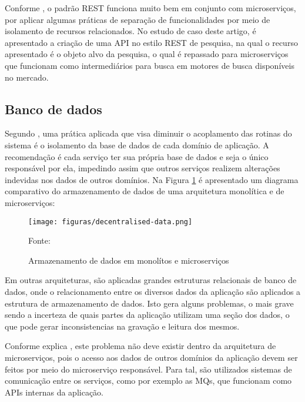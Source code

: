 Conforme , o padrão \ac{REST} funciona muito bem
em conjunto com microserviços, por aplicar algumas práticas de separação
de funcionalidades por meio de isolamento de recursos relacionados. No
estudo de caso deste artigo, é apresentado a criação de uma \ac{API} no
estilo \ac{REST} de pesquisa, na qual o recurso apresentado é o objeto
alvo da pesquisa, o qual é repassado para microserviços que funcionam
como intermediários para busca em motores de busca disponíveis no mercado.

\subsection{Banco de dados}

Segundo , uma prática aplicada que visa diminuir o
acoplamento das rotinas do sistema é o isolamento da base de dados de cada
domínio de aplicação. A recomendação é cada serviço ter sua própria base de
dados e seja o único responsável por ela, impedindo assim que outros serviços
realizem alterações indevidas nos dados de outros domínios. Na Figura
\ref{fig:db-monolith-microservices} é apresentado um diagrama comparativo do
armazenamento de dados de uma arquitetura monolítica e de microserviços:

\begin{figure}[H]
	\centering
	\caption{Armazenamento de dados em monolítos e microserviços}
	\texttt{[image: figuras/decentralised-data.png]}

	\label{fig:db-monolith-microservices}
	\footnotesize Fonte: 
\end{figure}

Em outras arquiteturas, são aplicadas grandes estruturas relacionais de banco
de dados, onde o relacionamento entre os diversos dados da aplicação são
aplicados a estrutura de armazenamento de dados. Isto gera alguns problemas,
o mais grave sendo a incerteza de quais partes da aplicação utilizam uma
seção dos dados, o que pode gerar inconsistencias na gravação e leitura dos
mesmos.

Conforme explica , este problema não deve existir
dentro da arquitetura de microserviços, pois o acesso aos dados de outros
domínios da aplicação devem ser feitos por meio do microserviço responsável.
Para tal, são utilizados sistemas de comunicação entre os serviços, como por
exemplo as \acp{MQ}, que funcionam como \acp{API} internas da aplicação.

